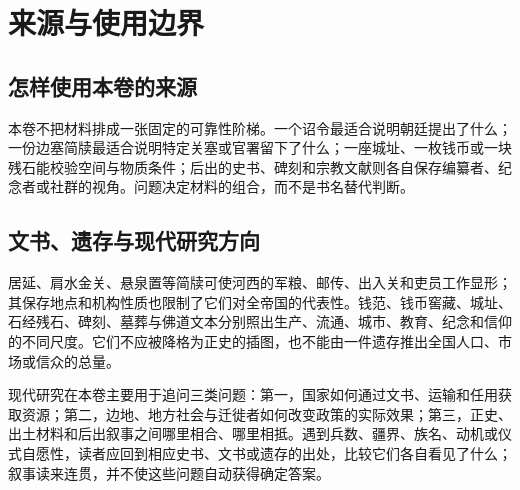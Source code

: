 \chapter{来源与使用边界}
\label{app:sources}

\section{怎样使用本卷的来源}

本卷不把材料排成一张固定的可靠性阶梯。一个诏令最适合说明朝廷提出了什么；一份边塞简牍最适合说明特定关塞或官署留下了什么；一座城址、一枚钱币或一块残石能校验空间与物质条件；后出的史书、碑刻和宗教文献则各自保存编纂者、纪念者或社群的视角。问题决定材料的组合，而不是书名替代判断。

\begin{description}
\end{description}

\section{文书、遗存与现代研究方向}

居延、肩水金关、悬泉置等简牍可使河西的军粮、邮传、出入关和吏员工作显形；其保存地点和机构性质也限制了它们对全帝国的代表性。钱范、钱币窖藏、城址、石经残石、碑刻、墓葬与佛道文本分别照出生产、流通、城市、教育、纪念和信仰的不同尺度。它们不应被降格为正史的插图，也不能由一件遗存推出全国人口、市场或信众的总量。

现代研究在本卷主要用于追问三类问题：第一，国家如何通过文书、运输和任用获取资源；第二，边地、地方社会与迁徙者如何改变政策的实际效果；第三，正史、出土材料和后出叙事之间哪里相合、哪里相抵。遇到兵数、疆界、族名、动机或仪式自愿性，读者应回到相应史书、文书或遗存的出处，比较它们各自看见了什么；叙事读来连贯，并不使这些问题自动获得确定答案。
